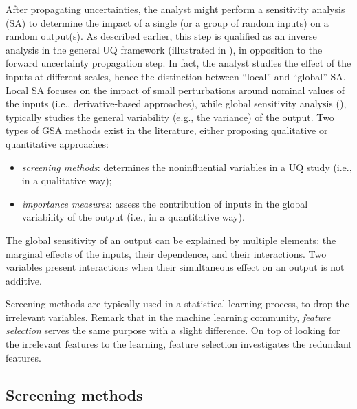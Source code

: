 After propagating uncertainties, the analyst might perform a sensitivity analysis (SA) to determine the impact of a single (or a group of random inputs) on a random output(s). 
As described earlier, this step is qualified as an inverse analysis in the general UQ framework (illustrated in ), in opposition to the forward uncertainty propagation step. 
In fact, the analyst studies the effect of the inputs at different scales, hence the distinction between ``local'' and ``global'' SA. 
Local SA focuses on the impact of small perturbations around nominal values of the inputs (i.e., derivative-based approaches), while
global sensitivity analysis (), typically studies the general variability (e.g., the variance) of the output. 
Two types of GSA methods exist in the literature, either proposing qualitative or quantitative approaches:  
\begin{itemize}
    \item \textit{screening methods}: determines the noninfluential variables in a UQ study (i.e., in a qualitative way);
    \item \textit{importance measures}: assess the contribution of inputs in the global variability of the output (i.e., in a quantitative way).
\end{itemize}

The global sensitivity of an output can be explained by multiple elements: the marginal effects of the inputs, their dependence, and their interactions. 
Two variables present interactions when their simultaneous effect on an output is not additive. 

Screening methods are typically used in a statistical learning process, to drop the irrelevant variables. 
Remark that in the machine learning community, \textit{feature selection} \citep{fan_2010_feature_selection} serves the same purpose with a slight difference. 
On top of looking for the irrelevant features to the learning, feature selection investigates the redundant features.     


\subsection{Screening methods}\label{sec:screening}

